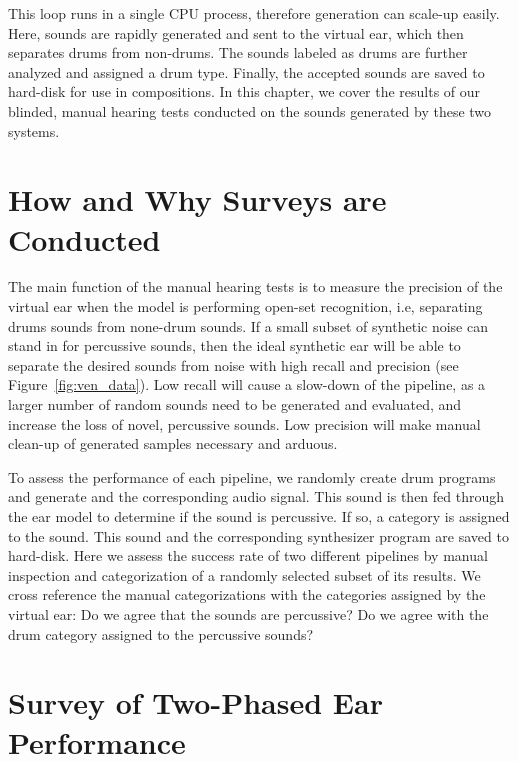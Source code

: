 \documentclass[\main/thesis.tex]{subfiles}
\begin{document}
This loop runs in a single CPU process, therefore generation can scale-up easily. Here, sounds are rapidly generated and sent to the virtual ear, which then separates drums from non-drums. The sounds labeled as drums are further analyzed and assigned a drum type. Finally, the accepted sounds are saved to hard-disk for use in compositions. In this chapter, we cover the results of our blinded, manual hearing tests conducted on the sounds generated by these two systems.

\label{gens}
\label{surveys}
\section{How and Why Surveys are Conducted}
 
 The main function of the manual hearing tests is to measure the precision of the virtual ear when the model is performing open-set recognition, i.e, separating drums sounds from none-drum sounds. If a small subset of synthetic noise can stand in for percussive sounds, then the ideal synthetic ear will be able to separate the desired sounds from noise with high recall and precision (see Figure~\ref{fig:ven_data}). Low recall will cause a slow-down of the pipeline, as a larger number of random sounds need to be generated and evaluated, and increase the loss of novel, percussive sounds. Low precision will make manual clean-up of generated samples necessary and arduous. 

To assess the performance of each pipeline, we randomly create drum programs and generate and the corresponding audio signal. This sound is then fed through the ear model to determine if the sound is percussive. If so, a category is assigned to the sound. This sound and the corresponding synthesizer program are saved to hard-disk. Here we assess the success rate of two different pipelines by manual inspection and categorization of a randomly selected subset of its results. We cross reference the manual categorizations with the categories assigned by the virtual ear: Do we agree that the sounds are percussive? Do we agree with the drum category assigned to the percussive sounds?
 
 \section{Survey of Two-Phased Ear Performance}
   
\end{document}

